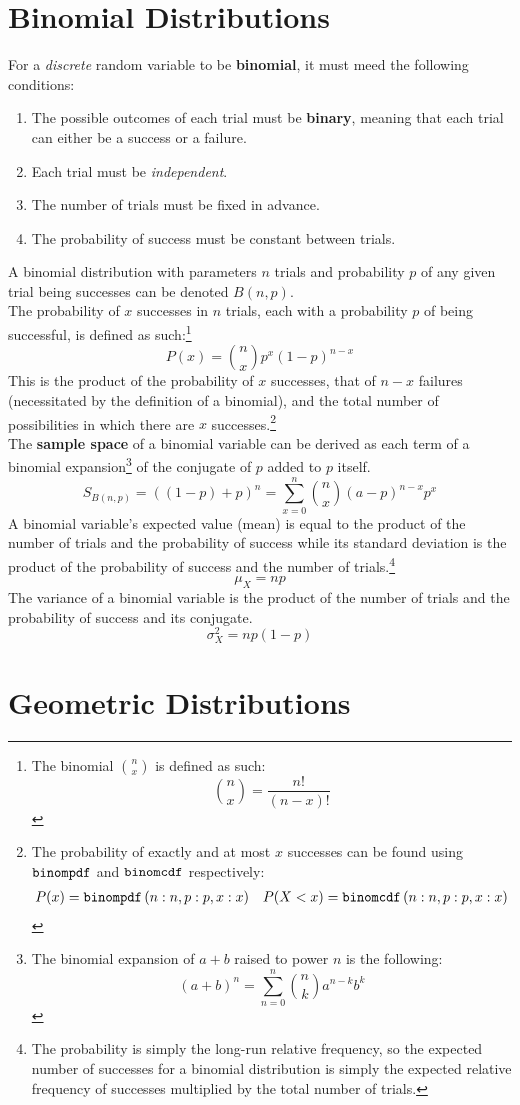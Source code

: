 \documentclass[../AP_Statistics.tex]{subfiles}
\begin{document}
		\section{Binomial Distributions}
			For a \emph{discrete} random variable to be \textbf{binomial}, it must meed the following conditions:
			\begin{enumerate}
				\item
					The possible outcomes of each trial must be \textbf{binary}, meaning that each trial can either be a success or a failure.
				\item
					Each trial must be \emph{independent}.
				\item
					The number of trials must be fixed in advance.
				\item
					The probability of success must be constant between trials.
			\end{enumerate}
			A binomial distribution with parameters $n$ trials and probability $p$ of any given trial being successes can be denoted $B(n, p)$. \\
			The probability of $x$ successes in $n$ trials, each with a probability $p$ of being successful, is defined as such:\footnote{The binomial $\binom{n}{x}$ is defined as such:\[\binom{n}{x} = \frac{n!}{(n - x)!}\]}
			\[P(x) = \binom{n}{x}p^x(1 - p)^{n - x}\]
			This is the product of the probability of $x$ successes, that of $n - x$ failures (necessitated by the definition of a binomial), and the total number of possibilities in which there are $x$ successes.\footnote{The probability of exactly and at most $x$ successes can be found using $\operatorname{\texttt{binompdf}}$ and $\operatorname{\texttt{binomcdf}}$ respectively:\begin{align*}P(x) = \operatorname{\texttt{binompdf}}\left(n:n, p:p, x:x\right) && P(X < x) = \operatorname{\texttt{binomcdf}}\left(n:n, p:p, x:x\right)\end{align*}} \\
			The \textbf{sample space} of a binomial variable can be derived as each term of a binomial expansion\footnote{The binomial expansion of $a + b$ raised to power $n$ is the following:\[(a + b)^n = \sum_{n = 0}^n\binom{n}{k}a^{n - k}b^k\]} of the conjugate of $p$ added to $p$ itself.
			\[S_{B(n, p)} = ((1 - p) + p)^n = \sum_{x = 0}^n\binom{n}{x}(a - p)^{n - x}p^x\]
			A binomial variable's expected value (mean) is equal to the product of the number of trials and the probability of success while its standard deviation is the product of the probability of success and the number of trials.\footnote{The probability is simply the long-run relative frequency, so the expected number of successes for a binomial distribution is simply the expected relative frequency of successes multiplied by the total number of trials.}
			\[\mu_X = np\]
			The variance of a binomial variable is the product of the number of trials and the probability of success and its conjugate.{}
			\[\sigma_X^2 = np(1 - p)\]
		\section{Geometric Distributions}
\end{document}
